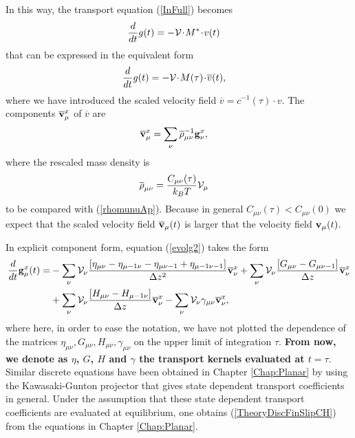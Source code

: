 \documentclass[b5paper,openright,10pt]{book}
\newcommand{\esc}{\!\cdot\!}
\newcommand{\Note}[1]{{\bf \color{red}#1}}    %
\begin{document}
In this way, the transport equation (\ref{InFull}) becomes
\begin{align}
 \frac{d}{dt}g(t)&= - {\cal V}\esc M^*\esc v(t) 
\label{InFullVel}
\end{align}
that can be  expressed in the equivalent form
\begin{align}
   \frac{d}{dt}g(t)&=  - {\cal V}\esc M(\tau)\esc \overline{v}(t),
\label{InFullVel2}
\end{align}
where  we  have introduced  the  scaled  velocity field  $\overline{v}
=c^{-1}(\tau)\esc  v$.   The  components $\overline{\bf  v}^x_\mu$  of
$\overline{v}$ are
\begin{align}
  \overline{\bf v}^x_\mu&=\sum_{\nu}\overline{\rho}_{\mu\nu}^{-1}{\bf g}^x_\nu,
\label{ov}
\end{align}
where the rescaled mass density is 
\begin{align}
  \overline{\rho}_{\mu\nu}&=\frac{C_{\mu\nu}(\tau)}{k_BT}  {\cal V}_\mu
\end{align}
to   be   compared   with    (\ref{rhomunuAp}).   Because   in   general
$C_{\mu\nu}(\tau)<C_{\mu\nu}(0)$  we expect  that the  scaled velocity
field  $\overline{\bf v}_\mu(t)$  is  larger that  the velocity  field
${\bf v}_\mu(t)$. 



In explicit component form,  equation (\ref{evolg2}) takes the form
\begin{align}
  \frac{d}{dt}{\bf g}^x_\mu(t)=&
-\sum_{\nu} {\cal V}_\nu \frac{\left[\eta_{\mu\nu}-\eta_{\mu-1\nu}-\eta_{\mu\nu-1}+\eta_{\mu-1\nu-1}\right]}{\Delta z^2}\overline{\bf v}^x_\nu
+\sum_{\nu} {\cal V}_\nu\frac{\left[G_{\mu\nu}-G_{\mu\nu-1}\right]}{\Delta z}\overline{\bf v}^x_\nu
\nonumber\\
&+\sum_{\nu} {\cal V}_\nu\frac{\left[H_{\mu\nu}-H_{\mu-1\nu}\right]}{\Delta z}
\overline{\bf v}^x_\nu
-\sum_{\nu} {\cal V}_\nu\gamma_{\mu\nu}\overline{\bf v}^x_\nu,
\label{TheoryDiscFinSlipCH}
\end{align}
where here,  in order to  ease the notation,  we have not  plotted the
dependence                of               the                matrices
$\eta_{\mu\nu},G_{\mu\nu},H_{\mu\nu},\gamma_{\mu\nu}$  on   the  upper
limit  of integration  $\tau$. \Note{From now, we denote as $\eta$, $G$, $H$ and $\gamma$ the transport kernels evaluated at $t=\tau$}.  Similar  discrete equations  have been
obtained in Chapter \ref{Chap:Planar}
by  using the Kawasaki-Gunton projector that
gives state  dependent transport coefficients in  general.  Under the
assumption  that  these  state dependent  transport  coefficients  are
evaluated at  equilibrium, one obtains (\ref{TheoryDiscFinSlipCH})  from the
equations in Chapter \ref{Chap:Planar}.
\end{document}
